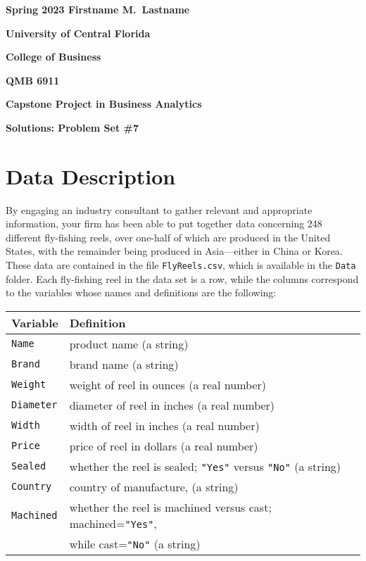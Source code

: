 \documentclass[11pt]{paper}
\begin{document}

\pagestyle{empty}
{\noindent\bf Spring 2023 \hfill Firstname M.~Lastname}
\vskip 16pt
\centerline{\bf University of Central Florida}
\centerline{\bf College of Business}
\vskip 16pt
\centerline{\bf QMB 6911}
\centerline{\bf Capstone Project in Business Analytics}
\vskip 10pt
\centerline{\bf Solutions:  Problem Set \#7}
\vskip 32pt
\noindent
% 
% 
\section{Data Description}
% 
By engaging an industry consultant to gather relevant and appropriate 
information, your firm has been able to put together data concerning 248 
different fly-fishing reels, over one-half of which are produced in the 
United States, with the remainder being produced in Asia---either in China 
or Korea.  These data are contained in the file {\tt FlyReels.csv}, which is
available in the {\tt Data} folder.
Each fly-fishing reel in the data set is a row, while the columns correspond 
to the variables whose names and definitions are the following:
\bigskip
\begin{table}[ht]
\centering
\begin{tabular}{ll}
  \hline
    Variable & Definition \\
  \hline

    {\tt Name}        &product name (a string) \\ 
    {\tt Brand}       &brand name (a string) \\ 
    {\tt Weight}      &weight of reel in ounces (a real number) \\ 
    {\tt Diameter}    &diameter of reel in inches (a real number) \\ 
    {\tt Width}       &width of reel in inches (a real number) \\ 
    {\tt Price}       &price of reel in dollars (a real number) \\ 
    {\tt Sealed}      &whether the reel is sealed; {\tt "Yes"} versus
                        {\tt "No"} (a string) \\ 
    {\tt Country}     &country of manufacture, (a string) \\ 
    {\tt Machined}    &whether the reel is machined versus cast;
                        machined={\tt "Yes"}, \\ 
                      &while cast={\tt "No"} (a string) \\ 
  \hline
\end{tabular}
\end{table}
\end{document}
